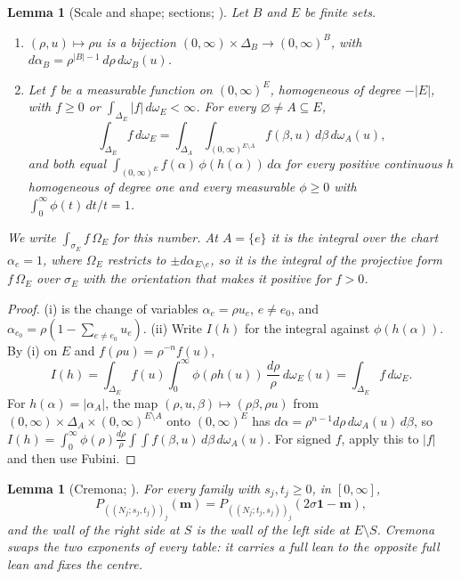 \documentclass[11pt]{article}
\theoremstyle{plain}
\newtheorem{lemma}[prop]{Lemma}
\theoremstyle{definition}
\theoremstyle{remark}
\newcommand{\bm}{\mathbf m}
\begin{document}
\begin{lemma}[Scale and shape; sections; {\cite[Lemma~2.7, p.~14; Lemma~16.2, p.~94]{F}}]\label{lem:sections}
Let $B$ and $E$ be finite sets.
\begin{enumerate}[label=(\roman*)]
\item $(\rho,u)\mapsto\rho u$ is a bijection $(0,\infty)\times\Delta_B\to(0,\infty)^B$, with $d\alpha_B=\rho^{|B|-1}\,d\rho\,d\omega_B(u)$.
\item Let $f$ be a measurable function on $(0,\infty)^E$, homogeneous of degree $-|E|$, with $f\ge0$ or $\int_{\Delta_E}|f|\,d\omega_E<\infty$. For every $\varnothing\neq A\subseteq E$,
\[
\int_{\Delta_E}f\,d\omega_E=\int_{\Delta_A}\int_{(0,\infty)^{E\setminus A}}f(\beta,u)\,d\beta\,d\omega_A(u),
\]
and both equal $\int_{(0,\infty)^E}f(\alpha)\,\phi(h(\alpha))\,d\alpha$ for every positive continuous $h$ homogeneous of degree one and every measurable $\phi\ge0$ with $\int_0^\infty\phi(t)\,dt/t=1$.
\end{enumerate}
We write $\int_{\sigma_E}f\,\Omega_E$ for this number. At $A=\{e\}$ it is the integral over the chart $\alpha_e=1$, where $\Omega_E$ restricts to $\pm d\alpha_{E\setminus e}$, so it is the integral of the projective form $f\,\Omega_E$ over $\sigma_E$ with the orientation that makes it positive for $f>0$.
\end{lemma}

\begin{proof}
(i) is the change of variables $\alpha_e=\rho u_e$, $e\neq e_0$, and $\alpha_{e_0}=\rho(1-\sum_{e\neq e_0}u_e)$. (ii) Write $I(h)$ for the integral against $\phi(h(\alpha))$. By (i) on $E$ and $f(\rho u)=\rho^{-n}f(u)$,
\[
I(h)=\int_{\Delta_E}f(u)\int_0^\infty\phi(\rho h(u))\,\frac{d\rho}\rho\,d\omega_E(u)=\int_{\Delta_E}f\,d\omega_E .
\]
For $h(\alpha)=|\alpha_A|$, the map $(\rho,u,\beta)\mapsto(\rho\beta,\rho u)$ from $(0,\infty)\times\Delta_A\times(0,\infty)^{E\setminus A}$ onto $(0,\infty)^E$ has $d\alpha=\rho^{n-1}d\rho\,d\omega_A(u)\,d\beta$, so $I(h)=\int_0^\infty\phi(\rho)\frac{d\rho}\rho\int\!\!\int f(\beta,u)\,d\beta\,d\omega_A(u)$. For signed $f$, apply this to $|f|$ and then use Fubini.
\end{proof}

\begin{lemma}[Cremona; {\cite[Thm.~8.12, Thm.~8.13, p.~57]{F}}]\label{lem:cremona}
For every family with $s_j,t_j\ge0$, in $[0,\infty]$,
\[
P_{((N_j;s_j,t_j))_j}(\bm)=P_{((N_j;t_j,s_j))_j}(2\sigma\mathbf 1-\bm),
\]
and the wall of the right side at $S$ is the wall of the left side at $E\setminus S$. Cremona swaps the two exponents of every table: it carries a full lean to the opposite full lean and fixes the centre.
\end{lemma}
\end{document}
